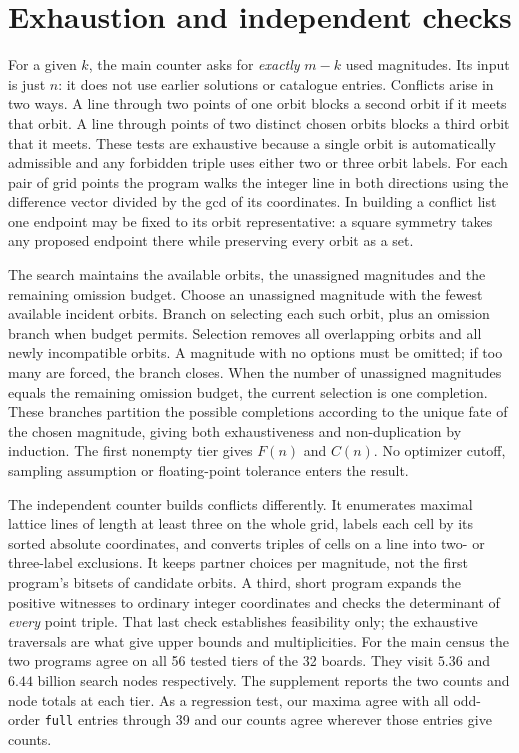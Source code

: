 \documentclass[11pt]{article}
\begin{document}
\section{Exhaustion and independent checks}
For a given $k$, the main counter asks for \emph{exactly} $m-k$ used magnitudes. Its input is just $n$: it does not use earlier solutions or catalogue entries. Conflicts arise in two ways. A line through two points of one orbit blocks a second orbit if it meets that orbit. A line through points of two distinct chosen orbits blocks a third orbit that it meets. These tests are exhaustive because a single orbit is automatically admissible and any forbidden triple uses either two or three orbit labels. For each pair of grid points the program walks the integer line in both directions using the difference vector divided by the gcd of its coordinates. In building a conflict list one endpoint may be fixed to its orbit representative: a square symmetry takes any proposed endpoint there while preserving every orbit as a set.

The search maintains the available orbits, the unassigned magnitudes and the remaining omission budget. Choose an unassigned magnitude with the fewest available incident orbits. Branch on selecting each such orbit, plus an omission branch when budget permits. Selection removes all overlapping orbits and all newly incompatible orbits. A magnitude with no options must be omitted; if too many are forced, the branch closes. When the number of unassigned magnitudes equals the remaining omission budget, the current selection is one completion. These branches partition the possible completions according to the unique fate of the chosen magnitude, giving both exhaustiveness and non-duplication by induction. The first nonempty tier gives $F(n)$ and $C(n)$. No optimizer cutoff, sampling assumption or floating-point tolerance enters the result.

The independent counter builds conflicts differently. It enumerates maximal lattice lines of length at least three on the whole grid, labels each cell by its sorted absolute coordinates, and converts triples of cells on a line into two- or three-label exclusions. It keeps partner choices per magnitude, not the first program's bitsets of candidate orbits. A third, short program expands the positive witnesses to ordinary integer coordinates and checks the determinant of \emph{every} point triple. That last check establishes feasibility only; the exhaustive traversals are what give upper bounds and multiplicities. For the main census the two programs agree on all 56 tested tiers of the 32 boards. They visit $5.36$ and $6.44$ billion search nodes respectively. The supplement reports the two counts and node totals at each tier. As a regression test, our maxima agree with all odd-order \texttt{full} entries through 39 and our counts agree wherever those entries give counts.
\end{document}
